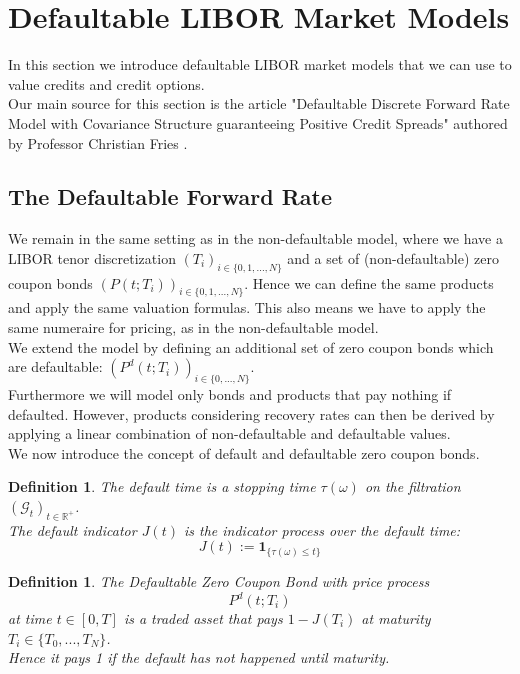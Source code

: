 \documentclass[12pt]{article}
\newtheorem{definition}[theorem]{Definition}
\begin{document}
	
	
	
	
	\pagebreak
	\section{Defaultable LIBOR Market Models}\label{sec:defaultableLMM}
	
	In this section we introduce defaultable LIBOR market models that we can use to value credits and credit options.\\
	Our main source for this section is the article "Defaultable Discrete Forward Rate Model with Covariance Structure guaranteeing Positive Credit Spreads" authored by Professor Christian Fries \cite{friesDLMM}.\\

	\subsection{The Defaultable Forward Rate}
		We remain in the same setting as in the non-defaultable model, where we have a LIBOR tenor discretization \((T_i)_{i\in\{0, 1, ..., N\}}\) and a set of (non-defaultable) zero coupon bonds \((P(t;T_i))_{i\in\{0, 1, ..., N\}}\). Hence we can define the same products and apply the same valuation formulas. This also means we have to apply the same numeraire for pricing, as in the non-defaultable model.\\
		We extend the model by defining an additional set of zero coupon bonds which are defaultable: \((P^d(t;T_i))_{i\in\{0, ..., N\}}\).\\
		Furthermore we will model only bonds and products that pay nothing if defaulted. However, products considering recovery rates can then be derived by applying a linear combination of non-defaultable and defaultable values.\\
		We now introduce the concept of default and defaultable zero coupon bonds.
	\begin{definition}
		The \emph{default time} is a stopping time \(\tau(\omega)\) on the filtration \((\mathcal{G}_t)_{t\in \mathbb{R}^+}\).\\
		The \emph{default indicator} \(J(t)\) is the indicator process over the default time:
		\[J(t) := \mathbf{1}_{\{\tau(\omega) \le t\}}\]
	\end{definition}
	\begin{definition}
		The \emph{Defaultable Zero Coupon Bond} with price process \[P^d(t; T_i)\] at time \(t \in \left[0, T\right]\) is a traded asset that pays \(1 - J(T_i)\) at maturity  \(T_i \in \{T_0, ..., T_N\}\).\\
		Hence it pays 1 if the default has not happened until maturity. 
	\end{definition}
\end{document}
